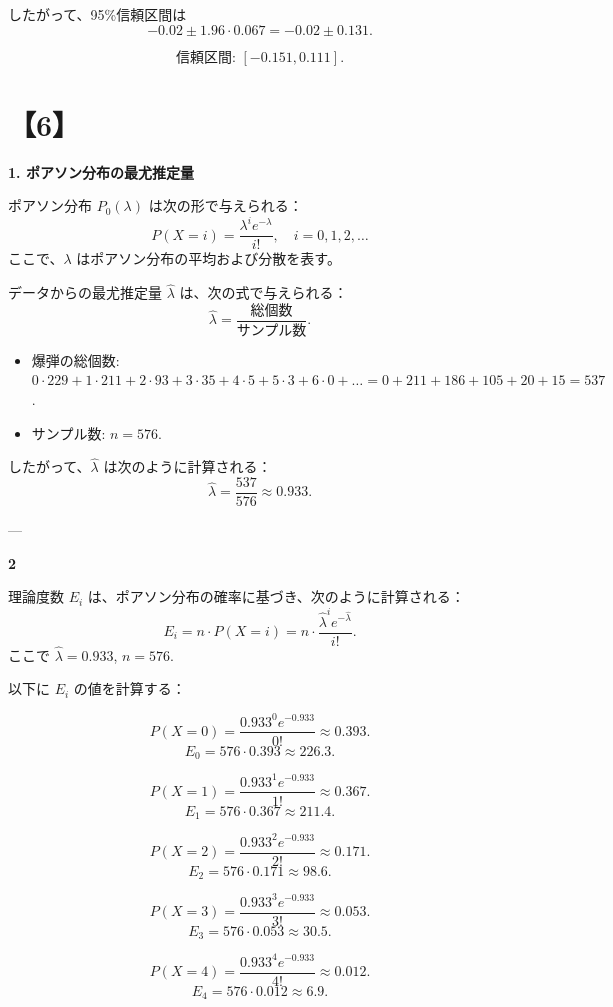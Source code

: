 \documentclass[10pt]{jsarticle}
\begin{document}
したがって、95\%信頼区間は
\[
-0.02 \pm 1.96 \cdot 0.067 = -0.02 \pm 0.131.
\]

\[
\text{信頼区間: } [-0.151, 0.111].
\]

\bigskip
\bigskip

\section*{【6】}

{\bf 1. ポアソン分布の最尤推定量}

ポアソン分布 \( P_0(\lambda) \) は次の形で与えられる：
\[
P(X = i) = \frac{\lambda^i e^{-\lambda}}{i!}, \quad i = 0, 1, 2, \dots
\]
ここで、\(\lambda\) はポアソン分布の平均および分散を表す。

データからの最尤推定量 \(\hat{\lambda}\) は、次の式で与えられる：
\[
\hat{\lambda} = \frac{\text{総個数}}{\text{サンプル数}}.
\]

\begin{itemize}
    \item 爆弾の総個数: \( 0 \cdot 229 + 1 \cdot 211 + 2 \cdot 93 + 3 \cdot 35 + 4 \cdot 5 + 5 \cdot 3 + 6 \cdot 0 + \dots = 0 + 211 + 186 + 105 + 20 + 15 = 537 \).
    \item サンプル数: \( n = 576 \).
\end{itemize}

したがって、\(\hat{\lambda}\) は次のように計算される：
\[
\hat{\lambda} = \frac{537}{576} \approx 0.933.
\]

---

{\bf 2}

理論度数 \( E_i \) は、ポアソン分布の確率に基づき、次のように計算される：
\[
E_i = n \cdot P(X = i) = n \cdot \frac{\hat{\lambda}^i e^{-\hat{\lambda}}}{i!}.
\]
ここで \( \hat{\lambda} = 0.933 \), \( n = 576 \).

以下に \( E_i \) の値を計算する：

\[
P(X = 0) = \frac{0.933^0 e^{-0.933}}{0!} \approx 0.393.
\]
\[
E_0 = 576 \cdot 0.393 \approx 226.3.
\]

\[
P(X = 1) = \frac{0.933^1 e^{-0.933}}{1!} \approx 0.367.
\]
\[
E_1 = 576 \cdot 0.367 \approx 211.4.
\]

\[
P(X = 2) = \frac{0.933^2 e^{-0.933}}{2!} \approx 0.171.
\]
\[
E_2 = 576 \cdot 0.171 \approx 98.6.
\]

\[
P(X = 3) = \frac{0.933^3 e^{-0.933}}{3!} \approx 0.053.
\]
\[
E_3 = 576 \cdot 0.053 \approx 30.5.
\]

\[
P(X = 4) = \frac{0.933^4 e^{-0.933}}{4!} \approx 0.012.
\]
\[
E_4 = 576 \cdot 0.012 \approx 6.9.
\]
\end{document}
